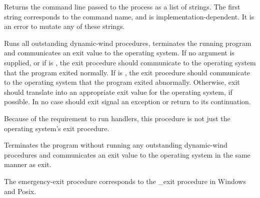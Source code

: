 \begin{entry}{%
}

Returns the command line passed to the process as a list of
strings.  The first string corresponds to the command name, and is
implementation-dependent.  It is an error to mutate any of these strings.
\end{entry}

\begin{entry}{%
}

Runs all outstanding dynamic-wind  procedures, terminates the
running program and communicates an exit value to the operating system.
If no argument is supplied, or if  is \schtrue{}, the {\cf
exit} procedure should communicate to the operating system that the
program exited normally.  If  is \schfalse{}, the {\cf exit}
procedure should communicate to the operating system that the program
exited abnormally.  Otherwise, {\cf exit} should translate  into
an appropriate exit value for the operating system, if possible.  In no
case should {\cf exit} signal an exception or return to its continuation.

\begin{note}
Because of the requirement to run handlers, this procedure is not just the
operating system's exit procedure.
\end{note}

\end{entry}

\begin{entry}{%
}

Terminates the program without running any
outstanding dynamic-wind  procedures
and communicates an exit value to the operating system
in the same manner as {\cf exit}.

\begin{note}
The {\cf emergency-exit} procedure corresponds to the {\cf \_exit} procedure
in Windows and Posix.
\end{note}

\end{entry}



